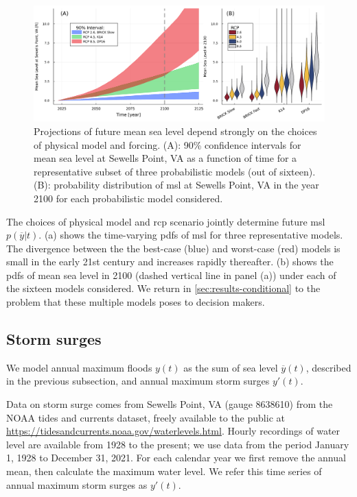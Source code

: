 \documentclass[11pt]{article}
\begin{document}
\begin{figure}
    \centering
    \includegraphics[width=\textwidth]{lsl-evolution}
    \caption{
        Projections of future mean sea level depend strongly on the choices of physical model and forcing.
        (A): 90\% confidence intervals for mean sea level at Sewells Point, VA as a function of time for a representative subset of three probabilistic models (out of sixteen).
        (B): probability distribution of \gls{msl} at Sewells Point, VA in the year 2100 for each probabilistic model considered.
    }\label{fig:lsl-evolution}
\end{figure}

The choices of physical model and \gls{rcp} scenario jointly determine future \gls{msl} $p(\overline{y}|t)$.
(a) shows the time-varying \glspl{pdf} of \gls{msl} for three representative models.
The divergence between the the best-case (blue) and worst-case (red) models is small in the early 21st century and increases rapidly thereafter.
(b) shows the \glspl{pdf} of mean sea level in 2100 (dashed vertical line in panel (a)) under each of the sixteen models considered.
We return in \cref{sec:results-conditional} to the problem that these multiple models poses to decision makers.

\subsection{Storm surges}\label{sec:case-surge}

We model annual maximum floods $y(t)$ as the sum of sea level $\overline{y}(t)$, described in the previous subsection, and annual maximum storm surges $y'(t)$.

Data on storm surge comes from Sewells Point, VA (gauge 8638610) from the NOAA tides and currents dataset,  freely available to the public at \url{https://tidesandcurrents.noaa.gov/waterlevels.html}.
Hourly recordings of water level are available from 1928 to the present; we use data from the period January 1, 1928 to December 31, 2021.
For each calendar year we first remove the annual mean, then calculate the maximum water level.
We refer this time series of annual maximum storm surges as $y'(t)$.
\end{document}

